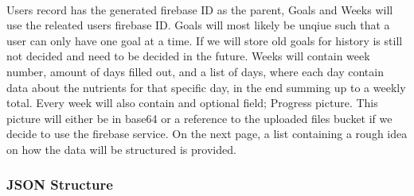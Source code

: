 \documentclass{article}
\begin{document}
        \paragraph{}
        Users record has the generated firebase ID as the parent, Goals and Weeks will use the releated users firebase ID.
        Goals will most likely be unqiue such that a user can only have one goal at a time. If we will store old goals for history
        is still not decided and need to be decided in the future. Weeks will contain week number, amount of days filled out, and a list of days, where each day
        contain data about the nutrients for that specific day, in the end summing up to a weekly total. Every week will also contain and optional field; Progress picture.
        This picture will either be in base64 or a reference to the uploaded files bucket if we decide to use the firebase service.
        On the next page, a list containing a rough idea on how the data will be structured is provided.

        \newpage
        \hfill \break
        \subsubsection{JSON Structure}

        \hfill \break
\end{document}
